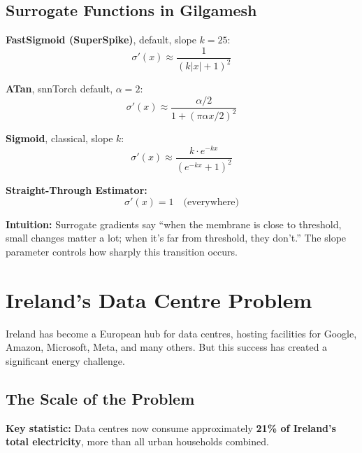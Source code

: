 \documentclass[11pt,a4paper]{article}
\begin{document}
\subsection{Surrogate Functions in Gilgamesh}

\textbf{FastSigmoid (SuperSpike)}, default, slope $k=25$:
\begin{equation}
    \sigma'(x) \approx \frac{1}{(k|x| + 1)^2}
\end{equation}

\textbf{ATan}, snnTorch default, $\alpha=2$:
\begin{equation}
    \sigma'(x) \approx \frac{\alpha/2}{1 + (\pi \alpha x / 2)^2}
\end{equation}

\textbf{Sigmoid}, classical, slope $k$:
\begin{equation}
    \sigma'(x) \approx \frac{k \cdot e^{-kx}}{(e^{-kx} + 1)^2}
\end{equation}

\textbf{Straight-Through Estimator:}
\begin{equation}
    \sigma'(x) = 1 \quad \text{(everywhere)}
\end{equation}

\begin{tcolorbox}[infobox]
\textbf{Intuition:} Surrogate gradients say ``when the membrane is close to threshold, small changes matter a lot; when it's far from threshold, they don't.'' The slope parameter controls how sharply this transition occurs.
\end{tcolorbox}

\section{Ireland's Data Centre Problem}

Ireland has become a European hub for data centres, hosting facilities for Google, Amazon, Microsoft, Meta, and many others. But this success has created a significant energy challenge.

\subsection{The Scale of the Problem}

\begin{tcolorbox}[keypoint]
\textbf{Key statistic:} Data centres now consume approximately \textbf{21\% of Ireland's total electricity}, more than all urban households combined.
\end{tcolorbox}
\end{document}
